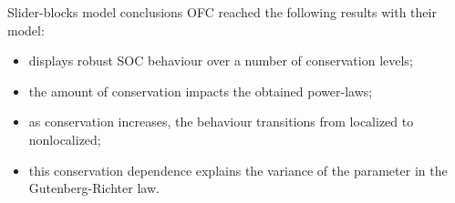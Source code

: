 \begin{frame}{Slider-blocks model conclusions}
OFC reached the following results with their model:
\begin{itemize}
	\item displays robust SOC behaviour over a number of conservation levels;
	\item the amount of conservation impacts the obtained power-laws;
	\item as conservation increases, the behaviour transitions from localized to nonlocalized;
	\item this conservation dependence explains the variance of the parameter in the Gutenberg-Richter law.
\end{itemize}
\end{frame}